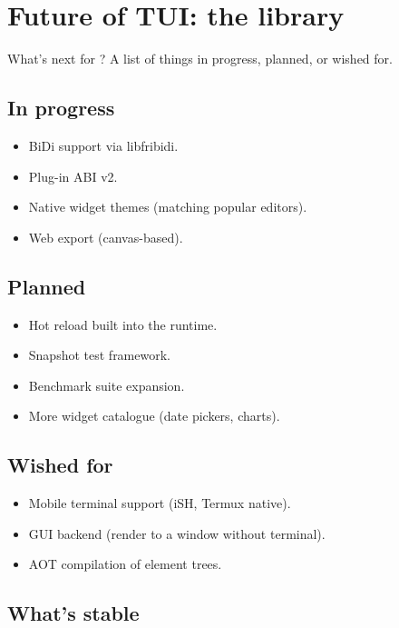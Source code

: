 \chapter{Future of TUI: the library}
\label{ch:future_library}

\begin{aside}
What's next for \maya{}? A list of things in progress,
planned, or wished for.
\end{aside}

\section{In progress}

\begin{itemize}[leftmargin=*]
  \item BiDi support via libfribidi.
  \item Plug-in ABI v2.
  \item Native widget themes (matching popular editors).
  \item Web export (canvas-based).
\end{itemize}

\section{Planned}

\begin{itemize}[leftmargin=*]
  \item Hot reload built into the runtime.
  \item Snapshot test framework.
  \item Benchmark suite expansion.
  \item More widget catalogue (date pickers, charts).
\end{itemize}

\section{Wished for}

\begin{itemize}[leftmargin=*]
  \item Mobile terminal support (iSH, Termux native).
  \item GUI backend (render to a window without
    terminal).
  \item AOT compilation of element trees.
\end{itemize}

\section{What's stable}


